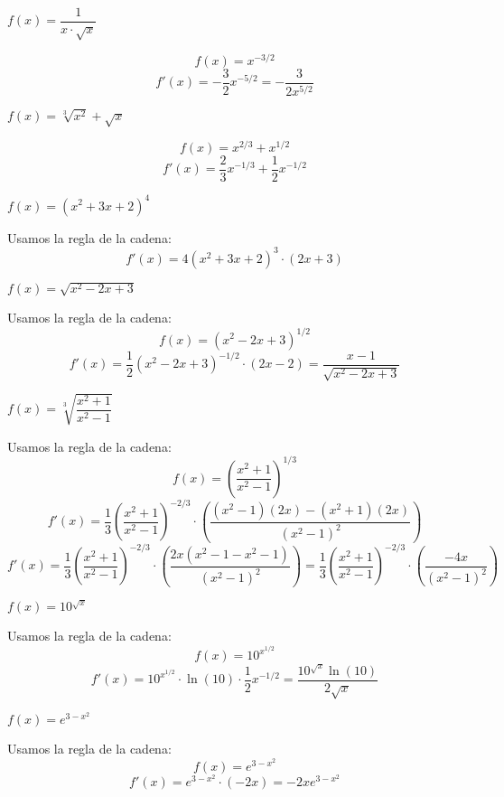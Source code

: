 \documentclass[answers]{exam} %
\begin{document}
\begin{questions}
    \question $f(x)=\dfrac{1}{x\cdot \sqrt{x}}$
    \begin{solution}
    \[
    f(x) = x^{-3/2}
    \]
    \[
    f'(x) = -\frac{3}{2}x^{-5/2} = -\frac{3}{2x^{5/2}}
    \]
    \end{solution}
    
    \question $f(x)=\sqrt[3]{x^2}+\sqrt{x}$
    \begin{solution}
    \[
    f(x) = x^{2/3} + x^{1/2}
    \]
    \[
    f'(x) = \frac{2}{3}x^{-1/3} + \frac{1}{2}x^{-1/2}
    \]
    \end{solution}
    
    \question $f(x)=(x^2+3x+2)^4$
    \begin{solution}
    Usamos la regla de la cadena:
    \[
    f'(x) = 4(x^2 + 3x + 2)^3 \cdot (2x + 3)
    \]
    \end{solution}
    
    \question $f(x)=\sqrt{x^2-2x+3}$
    \begin{solution}
    Usamos la regla de la cadena:
    \[
    f(x) = (x^2 - 2x + 3)^{1/2}
    \]
    \[
    f'(x) = \frac{1}{2}(x^2 - 2x + 3)^{-1/2} \cdot (2x - 2) = \frac{x-1}{\sqrt{x^2 - 2x + 3}}
    \]
    \end{solution}
    
    \question $f(x)=\sqrt[3]{\dfrac{x^2+1}{x^2-1}}$
    \begin{solution}
    Usamos la regla de la cadena:
    \[
    f(x) = \left( \frac{x^2+1}{x^2-1} \right)^{1/3}
    \]
    \[
    f'(x) = \frac{1}{3} \left( \frac{x^2+1}{x^2-1} \right)^{-2/3} \cdot \left( \frac{(x^2-1)(2x) - (x^2+1)(2x)}{(x^2-1)^2} \right)
    \]
    \[
    f'(x) = \frac{1}{3} \left( \frac{x^2+1}{x^2-1} \right)^{-2/3} \cdot \left( \frac{2x(x^2-1 - x^2 - 1)}{(x^2-1)^2} \right) = \frac{1}{3} \left( \frac{x^2+1}{x^2-1} \right)^{-2/3} \cdot \left( \frac{-4x}{(x^2-1)^2} \right)
    \]
    \end{solution}
    
    \question $f(x)=10^{\sqrt{x}}$
    \begin{solution}
    Usamos la regla de la cadena:
    \[
    f(x) = 10^{x^{1/2}}
    \]
    \[
    f'(x) = 10^{x^{1/2}} \cdot \ln(10) \cdot \frac{1}{2} x^{-1/2} = \frac{10^{\sqrt{x}} \ln(10)}{2\sqrt{x}}
    \]
    \end{solution}
    
    \question $f(x)=e^{3-x^2}$
    \begin{solution}
    Usamos la regla de la cadena:
    \[
    f(x) = e^{3-x^2}
    \]
    \[
    f'(x) = e^{3-x^2} \cdot (-2x) = -2xe^{3-x^2}
    \]
    \end{solution}
    

\end{questions}
\end{document}
